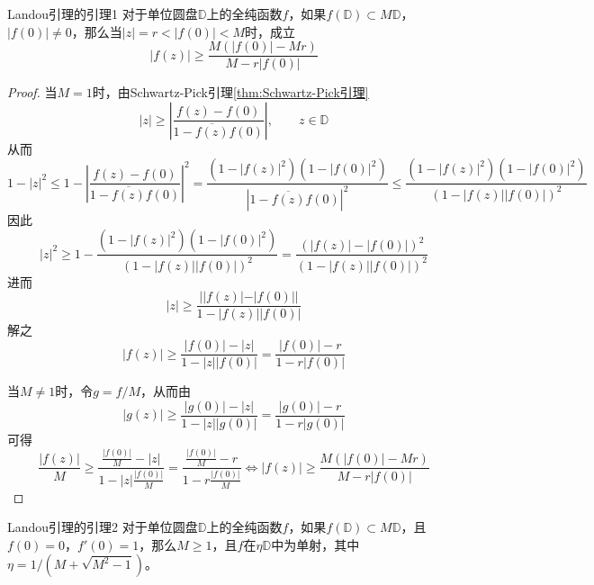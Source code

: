 \documentclass[lang = cn, scheme = chinese, thmcnt = section]{elegantbook}
\newcommand{\sub}{\subset}             %
\begin{document}
\begin{lemma}{}{Landou引理的引理1}
	对于单位圆盘$\mathbb{D}$上的全纯函数$f$，如果$f(\mathbb{D})\sub M\mathbb{D}$，$|f(0)|\ne 0$，那么当$|z|=r<|f(0)|<M$时，成立%
	$$
	|f(z)|\ge\frac{M(|f(0)|-Mr)}{M-r|f(0)|}
	$$
\end{lemma}

\begin{proof}
	当$M=1$时，由Schwartz-Pick引理\ref{thm:Schwartz-Pick引理}%
	$$
	|z|\ge \left| \frac{f(z)-f(0)}{1-\overline{f(z)}f(0)} \right|
	,\qquad
	z\in\mathbb{D}
	$$
	从而%
	$$
	1-|z|^2\le
	1-\left| \frac{f(z)-f(0)}{1-\overline{f(z)}f(0)} \right|^2
	=\frac{(1-|f(z)|^2)(1-|f(0)|^2)}{|1-\overline{f(z)}f(0)|^2}
	\le\frac{(1-|f(z)|^2)(1-|f(0)|^2)}{(1-|f(z)||f(0)|)^2}
	$$
	因此%
	$$
	|z|^2\ge 
	1-\frac{(1-|f(z)|^2)(1-|f(0)|^2)}{(1-|f(z)||f(0)|)^2}
	=\frac{(|f(z)|-|f(0)|)^2}{(1-|f(z)||f(0)|)^2}
	$$
	进而%
	$$
	|z|\ge \frac{||f(z)|-|f(0)||}{1-|f(z)||f(0)|}
	$$
	解之%
	$$
	|f(z)|\ge\frac{|f(0)|-|z|}{1-|z||f(0)|}
	=\frac{|f(0)|-r}{1-r|f(0)|}
	$$
	
	当$M\ne 1$时，令$g=f/M$，从而由
	$$
	|g(z)|\ge\frac{|g(0)|-|z|}{1-|z||g(0)|}
	=\frac{|g(0)|-r}{1-r|g(0)|}
	$$
	可得%
	$$
	\frac{|f(z)|}{M}\ge\frac{\frac{|f(0)|}{M}-|z|}{1-|z|\frac{|f(0)|}{M}}
	=\frac{\frac{|f(0)|}{M}-r}{1-r\frac{|f(0)|}{M}}
	\iff
	|f(z)|\ge\frac{M(|f(0)|-Mr)}{M-r|f(0)|}
	$$
\end{proof}

\begin{lemma}{}{Landou引理的引理2}
	对于单位圆盘$\mathbb{D}$上的全纯函数$f$，如果$f(\mathbb{D})\sub M\mathbb{D}$，且$f(0)=0$，$f'(0)=1$，那么$M\ge 1$，且$f$在$\eta\mathbb{D}$中为单射，其中$\eta=1/(M+\sqrt{M^2-1})$。
\end{lemma}
\end{document}
